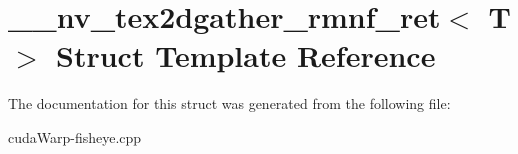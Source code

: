 \hypertarget{struct____nv__tex2dgather__rmnf__ret}{}\section{\+\_\+\+\_\+nv\+\_\+tex2dgather\+\_\+rmnf\+\_\+ret$<$ T $>$ Struct Template Reference}
\label{struct____nv__tex2dgather__rmnf__ret}


The documentation for this struct was generated from the following file\+:\begin{DoxyCompactItemize}
\item 
cuda\+Warp-\/fisheye.\+cpp\end{DoxyCompactItemize}
